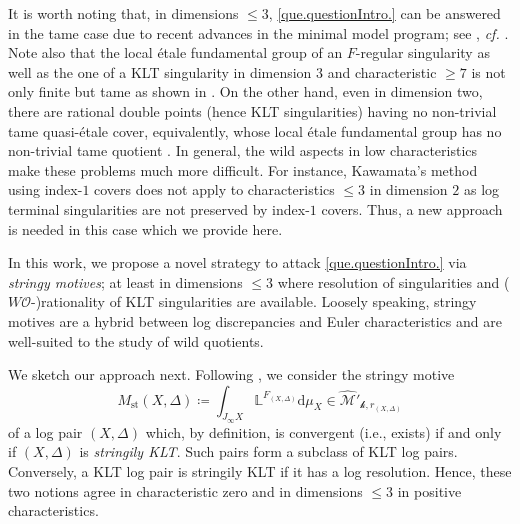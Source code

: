 \documentclass[12pt]{amsart}
\theoremstyle{plain}   %
\theoremstyle{definition}    %
\theoremstyle{remark}    %
\numberwithin{equation}{theorem}
\newcommand{\kay}{\mathcal{k}}
\newcommand{\sM}{\mathcal{M}}
\newcommand{\sO}{\mathcal{O}}
\newcommand{\bL}{\mathbb{L}}
\newcommand{\cf}{{\itshape cf.} }
\begin{document}
It is worth noting that, in dimensions $\leq 3$, \autoref{que.questionIntro.} can be answered in the tame case due to recent advances in the minimal model program; see \cite[Proposition 5.2]{HaconWitaszekMMPLowCharacteristic}, \cf \cite[Theorem 3.4]{XuZhangNonvanishing}.
Note also that the local \'etale fundamental group of an $F$-regular singularity as well as the one of a KLT singularity in dimension $3$ and characteristic $\ge 7$ is not only finite but tame as shown in \cite{CarvajalSchwedeTuckerEtaleFundFsignature,CarvajalRojasStablerKollarFundamentalGroupKLTthreefolds}. On the other hand, even in dimension two, there are rational double points (hence KLT singularities) having no non-trivial tame quasi-\'etale cover, equivalently, whose local \'etale fundamental group has no non-trivial tame quotient \cite[p.15]{ArtinCoveringsOfTheRtionalDoublePointsInCharacteristicp}. In general, the wild aspects in low characteristics make these problems much more difficult. For instance, Kawamata's method using index-$1$ covers does not apply to characteristics $\le 3$ in dimension $2$ as log terminal singularities are not preserved by index-$1$ covers. Thus, a new approach is needed in this case which we provide here. 

In this work, we propose a novel strategy to attack \autoref{que.questionIntro.} via \emph{stringy motives}; at least in dimensions $\leq 3$ where resolution of singularities and ($W\sO$-)rationality of KLT singularities are available. Loosely speaking, stringy motives are a hybrid between log discrepancies and Euler characteristics and are well-suited to the study of wild quotients.

We sketch our approach next. Following \cite[\S 6]{YasudaPcyclicMackayCorrespondenceMotivicIntegration}, we consider the stringy motive 
\[
M_{\mathrm{st}}(X,\Delta) \coloneqq \int_{J_{\infty}X}\bL^{F_{(X,\Delta)}} \mathrm{d}\mu_X \in \hat{\sM}'_{\kay,r_{(X,\Delta)}}
\]
of a log pair $(X,\Delta)$ which, by definition, is convergent (i.e., exists) if and only if $(X,\Delta)$ is \emph{stringily KLT}. Such pairs form a subclass of KLT log pairs. Conversely, a KLT log pair is stringily KLT if it has a log resolution. Hence, these two notions agree in characteristic zero and in dimensions $\leq 3$ in positive characteristics. 
\end{document}
